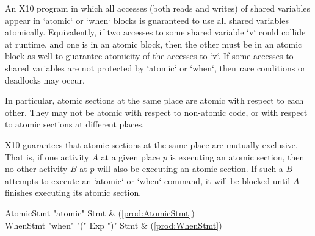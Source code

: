 An X10 program in which all accesses (both reads and writes) of shared
variables appear in \xcd`atomic` or \xcd`when` blocks is guaranteed to use all
shared variables atomically.  Equivalently, 
if two accesses to some shared variable \xcd`v` could collide at runtime, and
one is in an atomic block, then the other must be in an atomic block as well
to guarantee atomicity of the accesses to \xcd`v`. 
If some accesses to shared variables are not
protected by \xcd`atomic` or \xcd`when`, then race conditions or deadlocks may
occur.  

In particular, atomic sections at the same place are atomic with respect to
each other. They may not be atomic with respect to non-atomic code, or with
respect to atomic sections at different places.

X10 guarantees that atomic sections at the same place are mutually exclusive.
That is, if one activity $A$ at a given place $p$ is executing an atomic
section, then no other activity $B$ at $p$ will also be executing an atomic
section. If such a $B$ attempts to execute an \xcd`atomic` or \xcd`when`
command, it will be blocked until $A$ finishes executing its atomic section.  



\begin{bbgrammar}
          AtomicStmt \: \xcd"atomic" Stmt & (\ref{prod:AtomicStmt}) \\
            WhenStmt \: \xcd"when" \xcd"(" Exp \xcd")" Stmt & (\ref{prod:WhenStmt}) \\
\end{bbgrammar}

